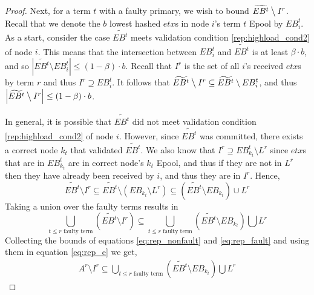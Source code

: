\begin{proof}
Next, for a term $t$ with a faulty primary, we wish to bound $ \widetilde{EB^t} \mathbin{\big\backslash} I^r$. Recall that we denote the $b$ lowest hashed $etx$s in node $i$'s term $t$ Epool by $EB_i^t$. As a start, consider the case $\widetilde{EB^t}$ meets validation condition \ref{rep:highload_cond2} of node $i$. This means that the intersection between $EB_i^t$ and $\widetilde{EB^t}$ is at least $\beta \cdot b$, and so $\left |\widetilde{EB^t}\setminus EB^t_i\right |\leq (1-\beta)\cdot b$. Recall that $I^r$ is the set of all $i$'s received $etx$s by term $r$ and thus $I^r \supseteq EB_i^t$. It follows that $\widetilde{EB^t} \mathbin{\big\backslash} I^r \subseteq \widetilde{EB^t} \setminus EB_i^t $, and thus $\left | \widetilde{EB^t} \mathbin{\big\backslash} I^r \right|\leq (1-\beta)\cdot b$.

In general, it is possible that $\widetilde{EB^t}$ did not meet validation condition \ref{rep:highload_cond2} of node $i$. However, since $\widetilde{EB^t}$ was committed, there exists a correct node $k_t$ that validated  $\widetilde{EB^t}$. We also know that $I^r\supseteq EB^t_{k_t}\setminus L^r$ since $etx$s that are in $EB^t_{k_t}$ are in correct node's $k_t$ Epool, and thus if they are not in $L^r$ then they have already been received by $i$, and thus they are in $I^r$. Hence,
\begin{equation}\widetilde{EB^t}\setminus I^r \subseteq \widetilde{EB^t} \setminus \left (EB_{k_t}\setminus L^r\right )\subseteq \left (\widetilde{EB^t} \setminus EB_{k_t}\right)\cup L^r 
\end{equation}
Taking a union over the faulty terms results in  
\begin{equation}\label{eq:rep_fault}
\bigcup_{t\leq r \text{ faulty term}} \left (\widetilde{EB^t} \setminus I^r\right) \subseteq \bigcup_{t\leq r \text{ faulty term}} \left (\widetilde{EB^t} \setminus EB_{k_t}\right) \bigcup L^r
\end{equation}
Collecting the bounds of equations \ref{eq:rep_nonfault} and \ref{eq:rep_fault} and  using them in equation \ref{eq:rep_e} we get,
\begin{equation}\begin{split} \label{eq:rep_sets}
A^r \setminus I^r \subseteq \bigcup_{t\leq r \text{ faulty term}} \left (\widetilde{EB^t} \setminus EB_{k_t}\right) \bigcup L^r
\end{split}\end{equation}



\end{proof}
